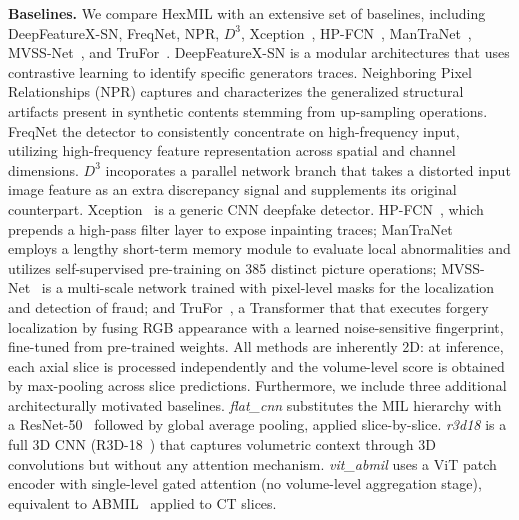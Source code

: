 \documentclass[sigconf, screen, review, anonymous]{acmart}
\begin{document}
\noindent\textbf{Baselines.}
We compare HexMIL with an extensive set of baselines, including DeepFeatureX-SN\cite{pontorno2024exploitation}, FreqNet\cite{tan2024frequency}, NPR\cite{tan2024rethinking}, $D^3$\cite{yang2025d}, Xception~\cite{chollet2017xception}, HP-FCN~\cite{li2019localization}, ManTraNet~\cite{wu2019mantra}, MVSS-Net~\cite{chen2021image}, and TruFor~\cite{guillaro2023trufor}. DeepFeatureX-SN\cite{pontorno2024exploitation} is a modular architectures that uses contrastive learning to identify specific generators traces. Neighboring Pixel Relationships (NPR)\cite{tan2024rethinking} captures and characterizes the generalized structural artifacts present in synthetic contents stemming from up-sampling operations. FreqNet\cite{tan2024frequency} the detector to consistently concentrate on high-frequency input, utilizing high-frequency feature representation across spatial and channel dimensions. $D^3$ incoporates a parallel network branch that takes a distorted input image feature as an extra discrepancy signal and supplements its original counterpart. Xception~\cite{chollet2017xception} is a generic CNN deepfake detector. HP-FCN~\cite{li2019localization}, which prepends a high-pass filter layer to expose inpainting traces; ManTraNet~\cite{wu2019mantra} employs a lengthy short-term memory module to evaluate local abnormalities and utilizes self-supervised pre-training on 385 distinct picture operations; MVSS-Net~\cite{chen2021image} is a multi-scale network trained with pixel-level masks for the localization and detection of fraud; and TruFor~\cite{guillaro2023trufor}, a Transformer that that executes forgery localization by fusing RGB appearance with a learned noise-sensitive fingerprint, fine-tuned from pre-trained weights. All methods are inherently 2D: at inference, each axial slice is processed independently and the volume-level score is obtained by max-pooling across slice predictions. Furthermore, we include three additional architecturally motivated baselines. \textit{flat\_cnn} substitutes the MIL hierarchy with a ResNet-50~\cite{he2016deep} followed by global average pooling, applied slice-by-slice. \textit{r3d18} is a full 3D CNN (R3D-18~\cite{tran2018closer}) that captures volumetric context through 3D convolutions but without any attention mechanism. \textit{vit\_abmil} uses a ViT\cite{dosovitskiy2020image} patch encoder with single-level gated attention (no volume-level aggregation stage), equivalent to ABMIL~\cite{ilse2018attention} applied to CT slices.
%
\end{document}

